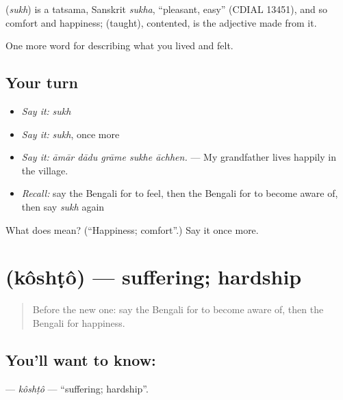 \begin{cousinweb}
\textbf{} (\emph{sukh}) is a tatsama, Sanskrit \emph{sukha}, \textquotedblleft{}pleasant, easy\textquotedblright{} (CDIAL 13451), and so comfort and happiness;  (taught), contented, is the adjective made from it.
\end{cousinweb}

\begin{grammarlens}[title={What you've built}]
One more word for describing what you lived and felt.
\end{grammarlens}

\subsection*{Your turn}
\begin{itemize}
\raggedright
  \item \emph{Say it:} \emph{sukh}
  \item \emph{Say it:} \emph{sukh}, once more
  \item \emph{Say it:} \emph{āmār dādu grāme sukhe āchhen.} — My grandfather lives happily in the village.
  \item \emph{Recall:} say the Bengali for to feel, then the Bengali for to become aware of, then say \emph{sukh} again
\end{itemize}

\begin{tcolorbox}[breakable,colback=teal!4,colframe=teal!35!black,title={Before you move on}]
What does  mean? (\textquotedblleft{}Happiness; comfort\textquotedblright{}.) Say it once more.
\end{tcolorbox}
\section[\texorpdfstring{\bn{কষ্ট} (kôshṭô)}{কষ্ট (kôshṭô)}]{ (kôshṭô) — suffering; hardship}

\label{lesson:BN-C439-koshto}



\begin{quote}
Before the new one: say the Bengali for to become aware of, then the Bengali for happiness.
\end{quote}

\subsection*{You'll want to know: }
\textbf{} — \emph{kôshṭô} — \textquotedblleft{}suffering; hardship\textquotedblright{}.

